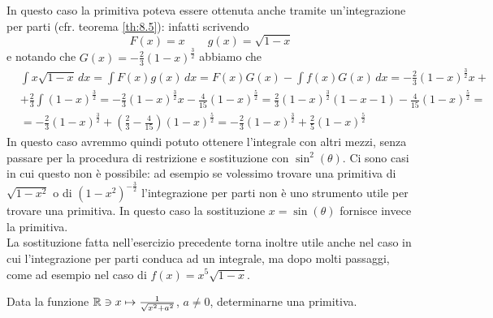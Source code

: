 \begin{remark}
    In questo caso la primitiva poteva essere ottenuta anche tramite un'integrazione per parti (cfr. teorema \ref{th:8.5}): infatti scrivendo
    \[
    F(x)=x \qquad g(x)=\sqrt{1-x}
    \]
    e notando che $G(x)=-\frac{2}{3}(1-x)^{\frac{3}{2}}$ abbiamo che
    \[
    \begin{split}
        &\int x\sqrt{1-x}\, dx = \int F(x)g(x)\, dx = F(x)G(x)-\int f(x)G(x)\, dx = -\frac{2}{3}(1-x)^{\frac{3}{2}}x+\\
        & +\frac{2}{3}\int (1-x)^{\frac{3}{2}} = -\frac{2}{3}(1-x)^{\frac{3}{2}}x-\frac{4}{15}(1-x)^{\frac{5}{2}} = \frac{2}{3}(1-x)^{\frac{3}{2}}(1-x-1) -\frac{4}{15}(1-x)^{\frac{5}{2}} = \\
        & = -\frac{2}{3}(1-x)^{\frac{3}{2}}  + \left(\frac{2}{3}-\frac{4}{15}\right)(1-x)^{\frac{5}{2}} = -\frac{2}{3}(1-x)^{\frac{3}{2}} + \frac{2}{5}(1-x)^{\frac{5}{2}}
    \end{split} 
    \]
    In questo caso avremmo quindi potuto ottenere l'integrale con altri mezzi, senza passare per la procedura di restrizione e sostituzione con $\sin^2(\theta)$. Ci sono casi in cui questo non è possibile: ad esempio se volessimo trovare una primitiva di $\sqrt{1-x^2}$ o di $(1-x^2)^{-\frac{3}{2}}$ l'integrazione per parti non è uno strumento utile per trovare una primitiva. In questo caso la sostituzione $x=\sin(\theta)$ fornisce invece la primitiva.\\
    La sostituzione fatta nell'esercizio precedente torna inoltre utile anche nel caso in cui l'integrazione per parti conduca ad un integrale, ma dopo molti passaggi, come ad esempio nel caso di $f(x)=x^5\sqrt{1-x}$.
\end{remark}
\begin{exercise}
    \label{ex:8.3}
    Data la funzione $\amsbb{R}\ni x \mapsto \frac{1}{\sqrt{x^2+a^2}}$, $a\ne 0$, determinarne una primitiva.
\end{exercise}
